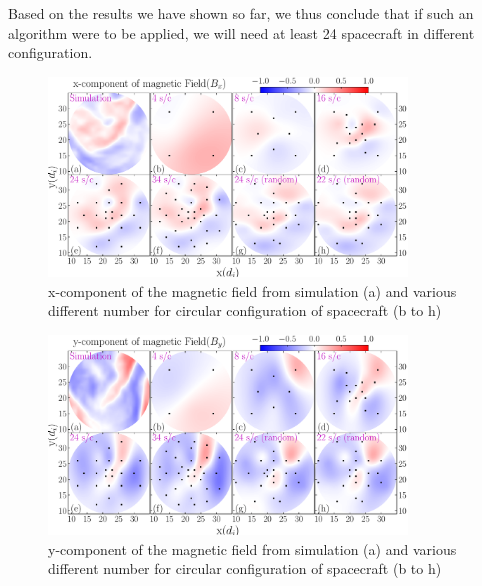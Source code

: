        Based on the results we have shown so far, we thus conclude that if such an algorithm were
        to be applied, we will need at least 24 spacecraft in different configuration.
        \begin{figure}
            \begin{center}
                \includegraphics[width=0.85\textwidth]{figures/chap8/all_spc_bx_4_8_16_24_34_24_22_000.pdf}
                \caption[Reconstructed field (x-component), circular configuration]{x-component of the magnetic field from simulation (a) and various different number for circular configuration of spacecraft (b to h)}
                \label{fig:gpr_bx}
            \end{center}
        \end{figure}

        \begin{figure}
            \begin{center}
                \includegraphics[width=0.85\textwidth]{figures/chap8/all_spc_by_4_8_16_24_34_24_22_000.pdf}
                \caption[Reconstructed field (y-component), circular configuration]{y-component of the magnetic field from simulation (a) and various different number for circular configuration of spacecraft (b to h)}
                \label{fig:gpr_by}
            \end{center}
        \end{figure}

